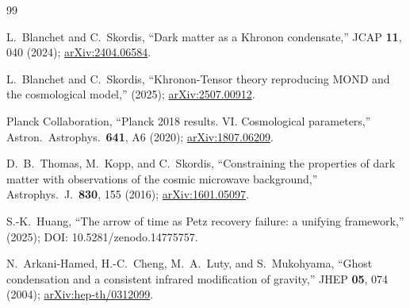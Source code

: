 \documentclass[prd,twocolumn,superscriptaddress,longbibliography,floatfix]{revtex4-2}
\begin{document}
\begin{thebibliography}{99}

L.~Blanchet and C.~Skordis,
``Dark matter as a Khronon condensate,''
JCAP \textbf{11}, 040 (2024);
\href{https://arxiv.org/abs/2404.06584}{arXiv:2404.06584}.

L.~Blanchet and C.~Skordis,
``Khronon-Tensor theory reproducing MOND and the cosmological model,''
(2025);
\href{https://arxiv.org/abs/2507.00912}{arXiv:2507.00912}.

Planck Collaboration,
``Planck 2018 results. VI. Cosmological parameters,''
Astron.\ Astrophys.\ \textbf{641}, A6 (2020);
\href{https://arxiv.org/abs/1807.06209}{arXiv:1807.06209}.

D.~B.~Thomas, M.~Kopp, and C.~Skordis,
``Constraining the properties of dark matter with
observations of the cosmic microwave background,''
Astrophys.\ J.\ \textbf{830}, 155 (2016);
\href{https://arxiv.org/abs/1601.05097}{arXiv:1601.05097}.

S.-K.~Huang,
``The arrow of time as Petz recovery failure:
a unifying framework,''
(2025);
DOI: 10.5281/zenodo.14775757.

N.~Arkani-Hamed, H.-C.~Cheng, M.~A.~Luty,
and S.~Mukohyama,
``Ghost condensation and a consistent infrared
modification of gravity,''
JHEP \textbf{05}, 074 (2004);
\href{https://arxiv.org/abs/hep-th/0312099}{arXiv:hep-th/0312099}.

\end{thebibliography}
\end{document}
